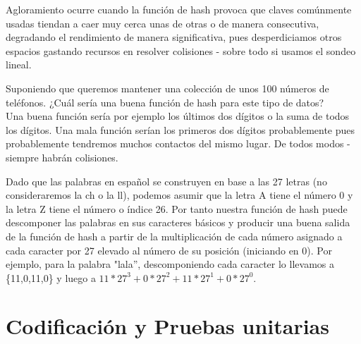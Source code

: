Agloramiento ocurre cuando la función de hash provoca que claves comúnmente usadas tiendan a caer muy cerca unas de otras o de manera consecutiva, degradando el rendimiento de manera significativa, pues desperdiciamos otros espacios gastando recursos en resolver colisiones - sobre todo si usamos el sondeo lineal. 



\begin{tcolorbox}[colback=gray!5!white,colframe=orange!60!gray,title=Ejemplo de buena función hash] Suponiendo que queremos mantener una colección de unos 100 números de teléfonos. ¿Cuál sería una buena función de hash para este tipo de datos? \\
Una buena función sería por ejemplo los últimos dos dígitos o la suma de todos los dígitos. Una mala función serían los primeros dos dígitos probablemente pues probablemente tendremos muchos contactos del mismo lugar. De todos modos - siempre habrán colisiones. 
\end{tcolorbox}




\begin{tcolorbox}[colback=gray!5!white,colframe=orange!60!gray,title=Ejemplo en Strings] Dado que las palabras en español se construyen en base a las 27 letras (no consideraremos la ch o la ll), podemos asumir que la letra A tiene el número 0 y la letra Z tiene el número o índice 26. Por tanto nuestra función de hash puede descomponer las palabras en sus caracteres básicos y producir una buena salida de la función de hash a partir de la multiplicación de cada número asignado a cada caracter por 27 elevado al número de su posición (iniciando en 0). Por ejemplo, para la palabra "lala'', descomponiendo cada caracter lo llevamos a \{11,0,11,0\} y luego a $11*27^3+0*27^2+11*27^1+0*27^0$. 
\end{tcolorbox}











\section{Codificación y Pruebas unitarias}

